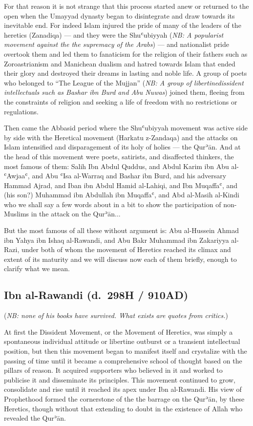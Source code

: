 \documentclass[12pt]{memoir}
\def\´{ʾ} %
\def\`{ʿ} %
\def \Quran{Qur\-\´ān} %
\def\/{\discretionary{/}{}{/}}
\newcommand{\NB}[1]{\emph{\small NB: #1}}
\begin{document}
For that reason it is not strange that this process started anew or returned to
the open when the Umayyad dynasty began to disintegrate and draw towards its
inevitable end. For indeed Islam injured the pride of many of the leaders of
the heretics (Zanadiqa) — and they were the Shu\`ubiyyah
(\NB{A popularist movement against the the supremacy of the Arabs})
— and nationalist pride overtook them and led them to fanaticism for the
religion of their fathers such as Zoroastrianism and Manichean dualism and
hatred towards Islam that ended their glory and destroyed their dreams in
lasting and noble life.
A group of poets who belonged to “The League of the Mujjan”
(\NB{A group of libertine\/dissident intellectuals such as Bashar ibn Burd and
Abu Nuwas})
joined them, fleeing from the constraints of religion
and seeking a life of freedom with no restrictions or regulations.

Then came the Abbasid period where the Shu\`ubiyyah movement was active side by
side with the Heretical movement (Harkatu z-Zandaqa) and the attacks on Islam
intensified and disparagement of its holy of holies — the \Quran. And at the
head of this movement were poets, satirists, and disaffected thinkers, the most
famous of them: Salih Ibn Abdul Quddus, and Abdul Karim ibn Abu al-\`Awjaa\`,
and Abu \`Isa al-Warraq and Bashar ibn Burd,
and his adversary Hammad Ajrad, and
Iban ibn Abdul Hamid al-Lahiqi, and Ibn Muqaffa\`, and (his son?) Muhammad ibn
Abdullah ibn Muqaffa\`, and Abd al-Masih al-Kindi who we shall say a few words
about in a bit to show the participation of non-Muslims in the attack on the
\Quran...

But the most famous of all these without argument is: Abu al-Hussein Ahmad ibn
Yahya ibn Ishaq al-Rawandi, and Abu Bakr Muhammad ibn Zakariyya al-Razi, under
both of whom the movement of Heretics reached its climax and extent of its
maturity and we will discuss now each of them briefly, enough to clarify what
we mean.


\subsection{Ibn al-Rawandi (d.\ 298H / 910AD)}

(\NB{none of his books have survived. What exists are quotes from critics.})

At first the Dissident Movement, or the Movement of Heretics, was simply a
spontaneous individual attitude or libertine outburst or a transient
intellectual position, but then this movement began to manifest itself and
crystalize with the passing of time until it became a comprehensive school of
thought based on the pillars of reason. It acquired supporters who believed in
it and worked to publicise it and disseminate its principles. This movement
continued to grow, consolidate and rise until it reached its apex under Ibn
al-Rawandi. His view of Prophethood formed the cornerstone of the the barrage
on the \Quran, by these Heretics, though without that extending to doubt in the
existence of Allah who revealed the \Quran.
\end{document}
